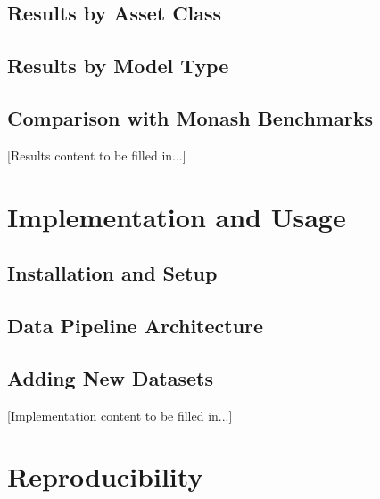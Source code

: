 \documentclass{article}
\begin{document}
\subsection{Results by Asset Class}

\subsection{Results by Model Type}

\subsection{Comparison with Monash Benchmarks}

[Results content to be filled in...]

\section{Implementation and Usage}
\label{sec:implementation}


\subsection{Installation and Setup}

\subsection{Data Pipeline Architecture}

\subsection{Adding New Datasets}

[Implementation content to be filled in...]

\section{Reproducibility}
\label{sec:reproducibility}

\end{document}
